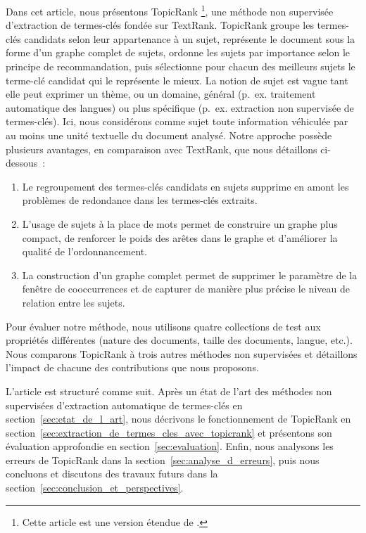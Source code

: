   Dans cet article, nous présentons TopicRank \footnote{Cette article est une
  version étendue de \cite{bougouin2013topicrank}.}, une méthode non supervisée
  d'extraction de termes-clés fondée sur TextRank. TopicRank groupe les
  termes-clés candidats selon leur appartenance à un sujet, représente le
  document sous la forme d'un graphe complet de sujets, ordonne les sujets par
  importance selon le principe de recommandation, puis sélectionne pour chacun
  des meilleurs sujets le terme-clé candidat qui le représente le mieux. La
  notion de sujet est vague tant elle peut exprimer un thème, ou un domaine,
  général (p.~ex. \og{}traitement automatique des langues\fg{}) ou plus
  spécifique (p.~ex. \og{}extraction non supervisée de termes-clés\fg{}). Ici,
  nous considérons comme sujet toute information véhiculée par au moins une
  unité textuelle du document analysé. Notre approche possède plusieurs
  avantages, en comparaison avec TextRank, que nous détaillons ci-dessous~:
  \begin{enumerate}
    \item{Le regroupement des termes-clés candidats en sujets supprime en amont
          les problèmes de redondance dans les termes-clés extraits.}
    \item{L'usage de sujets à la place de mots permet de construire un graphe
          plus compact, de renforcer le poids des arêtes dans le graphe et
          d'améliorer la qualité de l'ordonnancement.}
    \item{La construction d'un graphe complet permet de supprimer le paramètre
          de la fenêtre de cooccurrences et de capturer de manière plus précise
          le niveau de relation entre les sujets.}
  \end{enumerate}

  Pour évaluer notre méthode, nous utilisons quatre collections de test aux
  propriétés différentes (nature des documents, taille des documents, langue,
  etc.). Nous comparons TopicRank à trois autres méthodes non supervisées et
  détaillons l'impact de chacune des contributions que nous proposons.

  L'article est structuré comme suit. Après un état de l'art des méthodes non
  supervisées d'extraction automatique de termes-clés en
  section~\ref{sec:etat_de_l_art}, nous décrivons le fonctionnement de
  Topic\-Rank en section~\ref{sec:extraction_de_termes_cles_avec_topicrank} et
  présentons son évaluation approfondie en section~\ref{sec:evaluation}. Enfin,
  nous analysons les erreurs de TopicRank dans la
  section~\ref{sec:analyse_d_erreurs}, puis nous concluons et discutons des
  travaux futurs dans la section~\ref{sec:conclusion_et_perspectives}.

